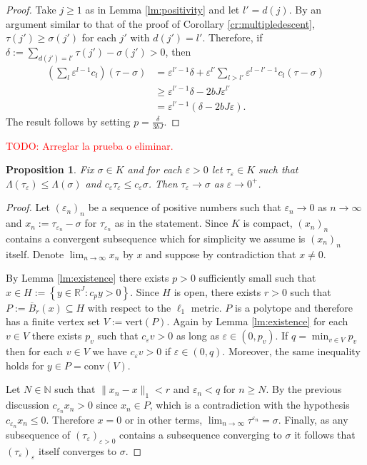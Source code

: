 \documentclass{article}
\newtheorem{proposition}[theorem]{Proposition}
\theoremstyle{definition}
\theoremstyle{remark}
\renewcommand{\leq}{\leqslant}
\renewcommand{\geq}{\geqslant}
\renewcommand{\epsilon}{\varepsilon}
\newcommand{\todo}[1]{\textcolor{red}{TODO: #1}}
\begin{document}
\begin{proof}
Take $j\geq 1$ as in Lemma \ref{lm:positivity} and let $l'=d(j)$.
By an argument similar to that of the proof of Corollary \ref{cr:multipledescent}, $\tau(j')\geq\sigma(j')$ for each $j'$ with $d(j')=l'$.
Therefore, if $\delta := \sum_{d(j')=l'}\tau(j')-\sigma(j')> 0$, then
\begin{align*}
\left(\sum_l \epsilon^{l-1}c_l\right) (\tau-\sigma) &= \epsilon^{l'-1}\delta  + \epsilon^{l'}\sum_{l>l'}\epsilon^{l-l'-1}c_l(\tau-\sigma)\\
&\geq\epsilon^{l'-1}\delta - 2bJ\epsilon^{l'}\\
&=\epsilon^{l'-1}\left(\delta - 2bJ\epsilon\right).
\end{align*}
The result follows by setting $\displaystyle p = \frac{\delta}{3bJ}$.
\end{proof}
\todo{Arreglar la prueba o eliminar.}
\begin{proposition}
Fix $\sigma\in K$ and for each $\epsilon>0$ let $\tau_\epsilon\in K$ such that $\Lambda(\tau_\epsilon)\leq \Lambda(\sigma)$ and $c_\epsilon \tau_\epsilon \leq c_\epsilon \sigma$.
Then $\tau_\epsilon\to\sigma$ as $\epsilon \to 0^+$.
\end{proposition}
\begin{proof}
Let $(\epsilon_n)_n$ be a sequence of positive numbers such that $\epsilon_n\to0$ as $n\to\infty$ and $x_n := \tau_{\epsilon_n} - \sigma$ for $\tau_{\epsilon_n}$ as in the statement.
Since $K$ is compact, $(x_n)_n$ contains a convergent subsequence which for simplicity we assume is $(x_n)_n$ itself.
Denote $\displaystyle\lim_{n\to\infty} x_n$ by $x$ and suppose by contradiction that $x\neq 0$.

By Lemma \ref{lm:existence} there exists $p > 0$ sufficiently small such that $x \in H := \left\{ y\in \mathbb R^J : c_p y > 0 \right\}$.
Since $H$ is open, there exists $r>0$ such that $P := \overline B_r(x) \subseteq H$ with respect to the $\ell_1$ metric.
$P$ is a polytope and therefore has a finite vertex set $V := \text{vert}(P)$.
Again by Lemma \ref{lm:existence} for each $v\in V$ there exists $p_v$ such that $c_\epsilon v > 0$ as long as $\epsilon \in (0,p_v)$.
If $q = \min_{v\in V}p_v$ then for each $v\in V$ we have $c_\epsilon v > 0$ if $\epsilon\in(0,q)$.
Moreover, the same inequality holds for $y\in P = \text{conv}(V)$.

Let $N\in \mathbb N$ such that $\|x_n-x\|_1<r$  and $\epsilon_n < q$ for $n\geqslant N$.
By the previous discussion $c_{\epsilon_n}x_n>0$ since $x_n\in P$, which is a contradiction with the hypothesis $c_{\epsilon_n}x_n\leq 0$.
Therefore $x = 0$ or in other terms, $\lim_{n\to\infty}\tau^{\epsilon_n} =\sigma$.
Finally, as any subsequence of $(\tau_\epsilon)_{\epsilon>0}$ contains a subsequence converging to $\sigma$ it follows that $(\tau_\epsilon)_\epsilon$ itself converges to $\sigma$.
\end{proof}

\printbibliography
\end{document}
